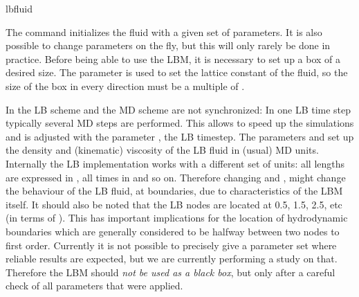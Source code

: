 \begin{essyntax}
  lbfluid
  \begin{features}
  \end{features}
\end{essyntax}
The  command initializes the fluid with a given
set of parameters. It is also possible to change parameters on the
fly, but this will only rarely be done in practice. Before being able
to use the LBM, it is necessary to set up a box of a desired size. The
parameter  is used to set the lattice constant of the
fluid, so the size of the box in every direction must be a multiple of
.

In \es the LB scheme and the MD scheme are not synchronized: In one LB
time step typically several MD steps are performed. This allows to
speed up the simulations and is adjusted with the parameter ,
the LB timestep.
The parameters  and  set up the density and
(kinematic) viscosity of the LB fluid in (usual) MD units.  Internally the LB
implementation works with a different set of units: all lengths are
expressed in , all times in  and so on.  Therefore
changing  and , might change the behaviour of the
LB fluid, \eg at boundaries, due to characteristics of the LBM
itself. It should also be noted that the LB nodes are located at 0.5, 1.5, 2.5, etc (in terms of ).
This has important implications for the location of hydrodynamic boundaries which are generally considered
to be halfway between two nodes to first order.
Currently it is not possible to precisely give a parameter set
where reliable results are expected, but we are currently performing a
study on that. Therefore the LBM should \emph{not be used as a black
  box}, but only after a careful check of all parameters that were
applied. 


